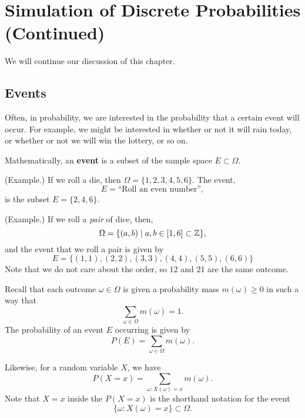 \documentclass[letterpaper]{article}
\begin{document}
\section{Simulation of Discrete Probabilities (Continued)}
We will continue our discussion of this chapter.

\subsection{Events}
Often, in probability, we are interested in the probability that a certain event will occur. For example, we might be interested in whether or not it will rain today, or whether or not we will win the lottery, or so on. 

\bigskip 

Mathematically, an \textbf{event} is a subset of the sample space $E \subset \Omega$. 

\begin{mdframed}[]
    (Example.) If we roll a die, then $\Omega = \{1, 2, 3, 4, 5, 6\}$. The event,
    \[E = \text{``Roll an even number''},\]
    is the subset $E = \{2, 4, 6\}$. 
\end{mdframed}

\begin{mdframed}[]
    (Example.) If we roll a \emph{pair} of dice, then,
    \[\Omega = \{(a, b) \mid a, b \in [1, 6] \subset \mathbb{Z}\},\]
    and the event that we roll a pair is given by 
    \[E = \{(1, 1), (2, 2), (3, 3), (4, 4), (5, 5), (6, 6)\}\]
    Note that we do not care about the order, so 12 and 21 are the same outcome.
\end{mdframed}

Recall that each outcome $\omega \in \Omega$ is given a probability mass $m(\omega) \geq 0$ in such a way that
\[\sum_{\omega \in \Omega} m(\omega) = 1.\]
The probability of an event $E$ occurring is given by 
\[P(E) = \sum_{\omega \in \Omega} m(\omega).\]

Likewise, for a random variable $X$, we have
\[P(X = x) = \sum_{\omega: X(\omega) = x} m(\omega).\]
Note that $X = x$ inside the $P(X = x)$ is the shorthand notation for the event 
\[\{\omega: X(\omega) = x\} \subset \Omega.\]
\end{document}
